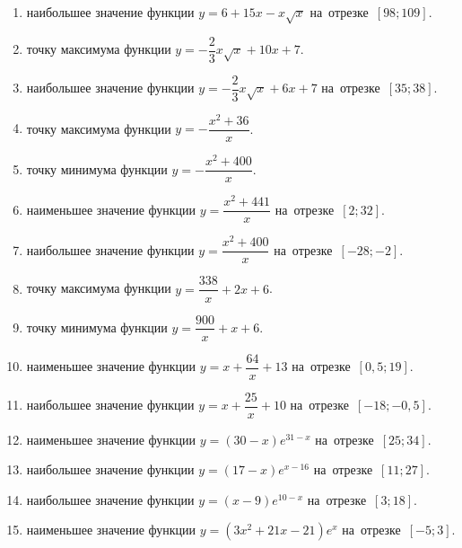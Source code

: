 \documentclass[a4paper,10pt]{article}
\begin{document}
\begin{enumerate}
\item {} наибольшее значение функции $y=6+15x -x\sqrt{x}$ на~отрезке~$\left[98;109\right]$.

\item {} точку максимума функции $y=-\dfrac{2}{3}x\sqrt{x} +10x+7$.

\item {} наибольшее значение функции $y=-\dfrac{2}{3}x\sqrt{x} +6x+7$ на~отрезке~$\left[35;38\right]$.

\item {} точку максимума функции $y=-\dfrac{x^2 +36}{x}$.

\item {} точку минимума функции $y=-\dfrac{x^2 +400}{x}$.

\item {} наименьшее значение функции $y=\dfrac{x^2 +441}{x}$ на~отрезке~$\left[2;32\right]$.

\item {} наибольшее значение функции $y=\dfrac{x^2 +400}{x}$ на~отрезке~$\left[-28;-2\right]$.

\item {} точку максимума функции $y=\dfrac{338}{x} +2x+6$.

\item {} точку минимума функции $y=\dfrac{900}{x} +x+6$.

\item {} наименьшее значение функции $y=x+\dfrac{64}{x} +13$ на~отрезке~$\left[0,5;19\right]$.

\item {} наибольшее значение функции $y=x+\dfrac{25}{x} +10$ на~отрезке~$\left[-18;-0,5\right]$.

\item {} наименьшее значение функции $y=\left(30-x\right)e^{31-x}$ на~отрезке~$\left[25;34\right]$.

\item {} наибольшее значение функции $y=\left(17-x\right)e^{x-16}$ на~отрезке~$\left[11;27\right]$.

\item {} наибольшее значение функции $y=\left(x-9\right)e^{10-x}$ на~отрезке~$\left[3;18\right]$.

\item {} наименьшее значение функции $y=\left(3x^2 +21x -21\right)e^{x }$ на~отрезке~$\left[-5;3\right]$.


\end{enumerate}
\end{document}
